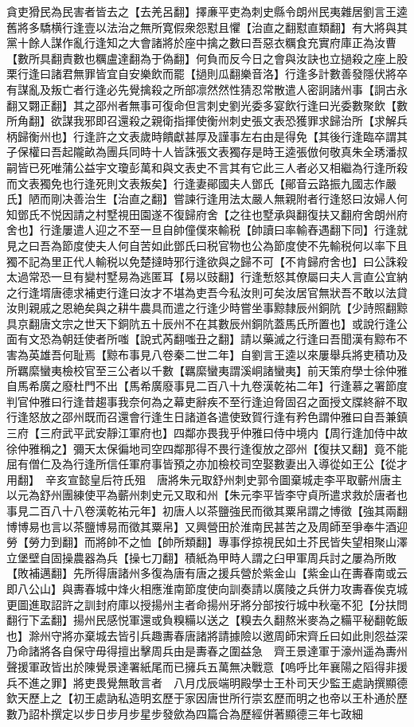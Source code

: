 貪吏猾民為民害者皆去之【去羌呂翻】擇亷平吏為刺史縣令朗州民夷雜居劉言王逵舊將多驕横行逢壹以法治之無所寛假衆怨懟且懼【治直之翻懟直類翻】有大將與其黨十餘人謀作亂行逢知之大會諸將於座中擒之數曰吾惡衣糲食充實府庫正為汝曹【數所具翻責數也糲盧達翻為于偽翻】何負而反今日之會與汝訣也立撾殺之座上股栗行逢曰諸君無罪皆宜自安樂飲而罷【撾則瓜翻樂音洛】行逢多計數善發隱伏將卒有謀亂及叛亡者行逢必先覺擒殺之所部凛然然性猜忍常散遣人密詗諸州事【詗古永翻又翾正翻】其之邵州者無事可復命但言刺史劉光委多宴飲行逢曰光委數聚飲【數所角翻】欲謀我邪即召還殺之親衛指揮使衡州刺史張文表恐獲罪求歸治所【求解兵柄歸衡州也】行逢許之文表歲時饋獻甚厚及謹事左右由是得免【其後行逢臨卒謂其子保權曰吾起隴畝為團兵同時十人皆誅張文表獨存是時王逵張倣何敬真朱全琇潘叔嗣皆已死唯蒲公益宇文瓊彭萬和與文表史不言其有它此三人者必又相繼為行逢所殺而文表獨免也行逢死則文表叛矣】行逢妻鄖國夫人鄧氏【鄖音云路振九國志作嚴氏】陋而剛决善治生【治直之翻】嘗諫行逢用法太嚴人無親附者行逢怒曰汝婦人何知鄧氏不悦因請之村墅視田園遂不復歸府舍【之往也墅承與翻復扶又翻府舍朗州府舍也】行逢屢遣人迎之不至一旦自帥僮僕來輸税【帥讀曰率輸舂遇翻下同】行逢就見之曰吾為節度使夫人何自苦如此鄧氏曰税官物也公為節度使不先輸税何以率下且獨不記為里正代人輸税以免楚撻時邪行逢欲與之歸不可【不肯歸府舍也】曰公誅殺太過常恐一旦有變村墅易為逃匿耳【易以豉翻】行逢慙怒其僚屬曰夫人言直公宜納之行逢壻唐德求補吏行逢曰汝才不堪為吏吾今私汝則可矣汝居官無狀吾不敢以法貸汝則親戚之恩絶矣與之耕牛農具而遣之行逢少時嘗坐事黥隸辰州銅阬【少詩照翻黥具京翻唐文宗之世天下銅阬五十辰州不在其數辰州銅阬蓋馬氏所置也】或說行逢公面有文恐為朝廷使者所嗤【說式芮翻嗤丑之翻】請以藥滅之行逢曰吾聞漢有黥布不害為英雄吾何耻焉【黥布事見八卷秦二世二年】自劉言王逵以來屢舉兵將吏積功及所羈縻蠻夷檢校官至三公者以千數【羈縻蠻夷謂溪峒諸蠻夷】前天策府學士徐仲雅自馬希廣之廢杜門不出【馬希廣廢事見二百八十九卷漢乾祐二年】行逢慕之署節度判官仲雅曰行逢昔趨事我奈何為之幕吏辭疾不至行逢迫脅固召之面授文牒終辭不取行逢怒放之邵州既而召還會行逢生日諸道各遣使致賀行逢有矜色謂仲雅曰自吾兼鎮三府【三府武平武安靜江軍府也】四鄰亦畏我乎仲雅曰侍中境内【周行逢加侍中故徐仲雅稱之】彌天太保徧地司空四鄰那得不畏行逢復放之邵州【復扶又翻】竟不能屈有僧仁及為行逢所信任軍府事皆預之亦加檢校司空娶數妻出入導從如王公【從才用翻】　辛亥宣懿皇后符氏殂　唐將朱元取舒州刺史郭令圖棄城走李平取蘄州唐主以元為舒州團練使平為蘄州刺史元又取和州【朱元李平皆李守貞所遣求救於唐者也事見二百八十八卷漢乾祐元年】初唐人以茶鹽強民而徵其粟帛謂之博徵【強其兩翻博博易也言以茶鹽博易而徵其粟帛】又興營田於淮南民甚苦之及周師至爭奉牛酒迎勞【勞力到翻】而將帥不之恤【帥所類翻】專事俘掠視民如土芥民皆失望相聚山澤立堡壁自固操農器為兵【操七刀翻】積紙為甲時人謂之臼甲軍周兵討之屢為所敗【敗補邁翻】先所得唐諸州多復為唐有唐之援兵營於紫金山【紫金山在夀春南或云即八公山】與夀春城中烽火相應淮南節度使向訓奏請以廣陵之兵併力攻夀春俟克城更圖進取詔許之訓封府庫以授揚州主者命揚州牙將分部按行城中秋毫不犯【分扶問翻行下孟翻】揚州民感悦軍還或負糗糒以送之【糗去久翻熬米麥為之糒平秘翻乾飯也】滁州守將亦棄城去皆引兵趣夀春唐諸將請據險以邀周師宋齊丘曰如此則怨益深乃命諸將各自保守毋得擅出擊周兵由是夀春之圍益急　齊王景達軍于濠州遥為夀州聲援軍政皆出於陳覺景達署紙尾而已擁兵五萬無决戰意【嗚呼比年襄陽之䧟得非援兵不進之罪】將吏畏覺無敢言者　八月戊辰端明殿學士王朴司天少監王處訥撰顯德欽天歷上之【初王處訥私造明玄歷于家因唐世所行崇玄歷而明之也帝以王朴通於歷數乃詔朴撰定以步日步月步星步發歛為四篇合為歷經併著顯德三年七政細
